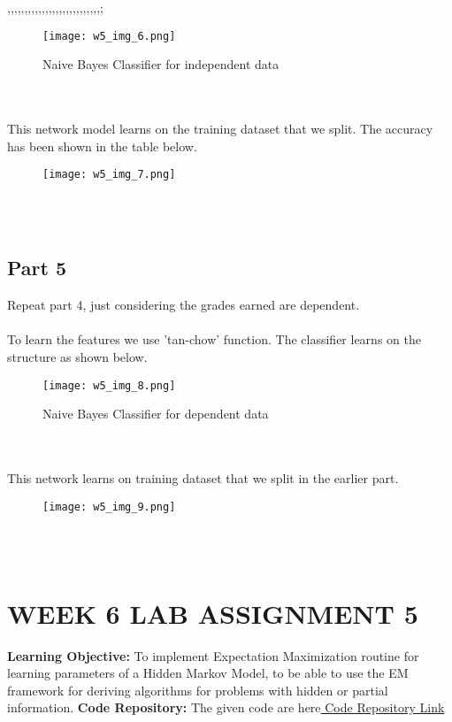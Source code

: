 ,,,,,,,,,,,,,,,,,,,,,,,,,,,;\documentclass[conference]{IEEEtran}
\begin{document}
\begin{figure}[htbp]
\centerline{\texttt{[image: w5\_img\_6.png]}}
\caption{Naive Bayes Classifier for independent data}
\label{fig}
\end{figure}

\\
\\
This network model learns on the training dataset that we split. The accuracy has been shown in the table below.

\begin{figure}[htbp]
\centerline{\texttt{[image: w5\_img\_7.png]}}

\label{fig}
\end{figure}
\\
\\
\subsection{Part 5}
Repeat part 4, just considering the grades earned are dependent.
\\
\\
To learn the features we use 'tan-chow' function. The classifier learns on the structure as shown below.

\begin{figure}[htbp]
\centerline{\texttt{[image: w5\_img\_8.png]}}
\caption{Naive Bayes Classifier for dependent data}
\label{fig}
\end{figure}
\\
\\
This network learns on training dataset that we split in the earlier part.

\begin{figure}[htbp]
\centerline{\texttt{[image: w5\_img\_9.png]}}

\label{fig}
\end{figure}
\\
\\
\section{WEEK 6 LAB ASSIGNMENT 5}
\textbf{Learning Objective:}
To implement Expectation Maximization routine for learning parameters of a Hidden Markov Model, to be able to use the EM framework for deriving algorithms for problems with hidden or partial information.
\textbf{Code Repository:}
The given code are here\href{https://github.com/darshh311/CS362_lab}{ Code Repository Link}
\end{document}
